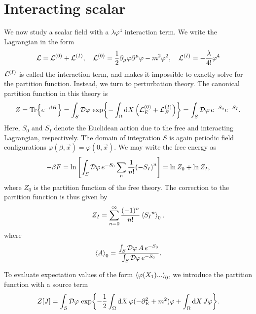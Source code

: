 \section{Interacting scalar}
\label{section: interacting scalar}

We now study a scalar field with a $\lambda \varphi^4$ interaction term.
We write the Lagrangian in the form
\begin{equation*}
    \mathcal{L} = \mathcal{L}^{(0)} + \mathcal{L}^{(I)}, \quad 
    \mathcal{L}^{(0)} = 
    \frac{1}{2} \partial_\mu \varphi \partial^\mu \varphi - m^2 \varphi^2 , \quad
    \mathcal{L}^{(I)} = - \frac{\lambda}{4!} \varphi^4
\end{equation*}
%
$\mathcal{L}^{(I)}$ is called the interaction term, and makes it impossible to exactly solve for the partition function.
Instead, we turn to perturbation theory.
The canonical partition function in this theory is
\begin{equation}
    Z = \Tr{e^{- \beta \hat H}}
    = \int_S \mathcal D \varphi \, \exp{
        - \int_\Omega \dd X \left(\mathcal{L}_E^{(0)} + \mathcal{L}_E^{(I)}\right)
    }
    = \int_S \mathcal D \varphi \, e^{-S_0} e^{-S_I}.
\end{equation}
%
Here, $S_0$ and $S_I$ denote the Euclidean action due to the free and interacting Lagrangian, respectively.
The domain of integration $S$ is again periodic field configurations $\varphi(\beta, \vec x) = \varphi(0, \vec x)$.
We may write the free energy as
\begin{equation*}
    - \beta F = \ln
    \left[
        \int_S \mathcal D \varphi \, e^{-S_0} \sum_n \frac{1}{n!} {(-S_I)}^n
    \right]
    = \ln Z_0 
    + \ln Z_I ,
\end{equation*}
%
where $Z_0$ is the partition function of the free theory.
The correction to the partition function is thus given by
\begin{equation}
    Z_I = \sum_{n=0}^\infty \frac{(-1)^n}{n!} \left\langle {S_I}^n \right\rangle_0,
\end{equation}
%
where
\begin{equation}
    \left\langle A \right\rangle_0 = \frac{
        \int_S \mathcal D \varphi \, A \, e^{-S_0} }
    {\int_S \mathcal D \varphi \, e^{-S_0}}.
\end{equation}
%

To evaluate expectation values of the form $\left\langle \varphi(X_1) ...  \right\rangle_0$, we introduce the partition function with a source term
\begin{align}
    Z[J] = \int_S \mathcal D \varphi \, \exp{
        - \frac{1}{2} \int_\Omega \dd X \, \varphi (-\partial_E^2 + m^2) \varphi
        + \int_\Omega \dd X \, J \varphi
    }.
\end{align}

